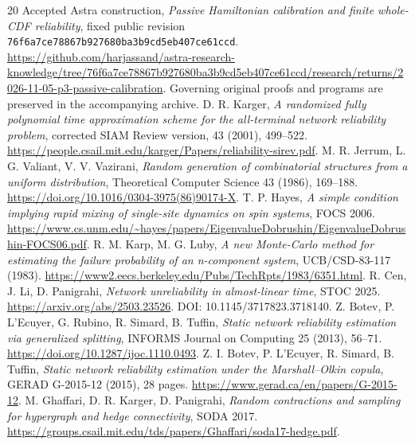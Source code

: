\documentclass[11pt]{article}
\begin{document}
\begin{thebibliography}{20}
 Accepted Astra construction, \emph{Passive Hamiltonian calibration and finite whole-CDF reliability}, fixed public revision \texttt{76f6a7ce78867b927680ba3b9cd5eb407ce61ccd}. \url{https://github.com/harjassand/astra-research-knowledge/tree/76f6a7ce78867b927680ba3b9cd5eb407ce61ccd/research/returns/2026-11-05-p3-passive-calibration}. Governing original proofs and programs are preserved in the accompanying archive.
 D. R. Karger, \emph{A randomized fully polynomial time approximation scheme for the all-terminal network reliability problem}, corrected SIAM Review version, 43 (2001), 499--522. \url{https://people.csail.mit.edu/karger/Papers/reliability-sirev.pdf}.
 M. R. Jerrum, L. G. Valiant, V. V. Vazirani, \emph{Random generation of combinatorial structures from a uniform distribution}, Theoretical Computer Science 43 (1986), 169--188. \url{https://doi.org/10.1016/0304-3975(86)90174-X}.
 T. P. Hayes, \emph{A simple condition implying rapid mixing of single-site dynamics on spin systems}, FOCS 2006. \url{https://www.cs.unm.edu/~hayes/papers/EigenvalueDobrushin/EigenvalueDobrushin-FOCS06.pdf}.
 R. M. Karp, M. G. Luby, \emph{A new Monte-Carlo method for estimating the failure probability of an n-component system}, UCB/CSD-83-117 (1983). \url{https://www2.eecs.berkeley.edu/Pubs/TechRpts/1983/6351.html}.
 R. Cen, J. Li, D. Panigrahi, \emph{Network unreliability in almost-linear time}, STOC 2025. \url{https://arxiv.org/abs/2503.23526}. DOI: 10.1145/3717823.3718140.
 Z. Botev, P. L'Ecuyer, G. Rubino, R. Simard, B. Tuffin, \emph{Static network reliability estimation via generalized splitting}, INFORMS Journal on Computing 25 (2013), 56--71. \url{https://doi.org/10.1287/ijoc.1110.0493}.
 Z. I. Botev, P. L'Ecuyer, R. Simard, B. Tuffin, \emph{Static network reliability estimation under the Marshall--Olkin copula}, GERAD G-2015-12 (2015), 28 pages. \url{https://www.gerad.ca/en/papers/G-2015-12}.
 M. Ghaffari, D. R. Karger, D. Panigrahi, \emph{Random contractions and sampling for hypergraph and hedge connectivity}, SODA 2017. \url{https://groups.csail.mit.edu/tds/papers/Ghaffari/soda17-hedge.pdf}.
\end{thebibliography}
\end{document}

